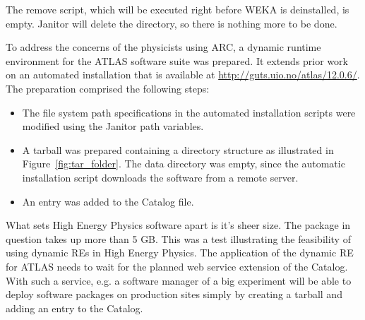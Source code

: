 The remove script, which will be executed right before WEKA is deinstalled, is empty.
Janitor will delete the directory, so there is nothing more to be done.



To address the concerns of the physicists using ARC, a dynamic runtime
environment for the ATLAS software suite was prepared. It extends prior
work on an automated installation that is available at
\href{http://guts.uio.no/atlas/12.0.6/}{http://guts.uio.no/atlas/12.0.6/}.
The preparation comprised the following steps:
\begin{itemize}
    \item The file system path specifications in the automated
       installation scripts were modified using the Janitor
       path variables.
    \item A tarball was prepared containing a directory structure as
       illustrated in Figure~\ref{fig:tar_folder}. The data directory
       was empty, since the automatic installation script downloads the
       software from a remote server.
    \item An entry was added to the Catalog file.
\end{itemize}

What sets High Energy Physics software apart is it's sheer size. The
package in question takes up more than 5 GB. This was a test illustrating
the feasibility of using dynamic REs in High Energy Physics. The
application of the dynamic RE for ATLAS needs to wait for the planned web
service extension of the Catalog. With such a service, e.g. a software
manager of a big experiment will be able to deploy software packages
on production sites simply by creating a tarball and adding an entry to
the Catalog.


%
%
%
%


